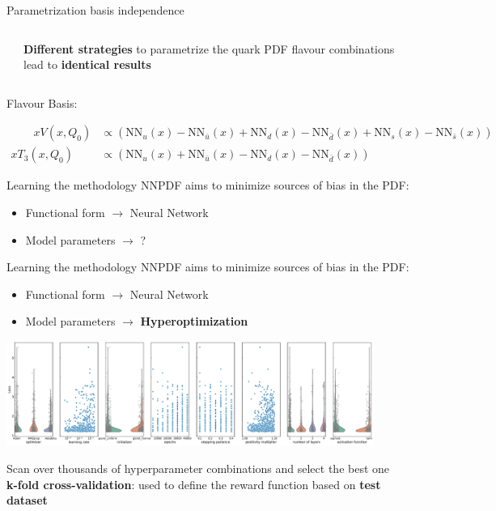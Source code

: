\documentclass[aspectratio=169,9pt]{beamer}
\begin{document}
\begin{frame}{Parametrization basis independence}
\begin{columns}
{		    }
            \begin{block}{}
                \textbf{Different strategies} to parametrize the quark PDF flavour combinations lead to \textbf{identical results}
            \end{block}
    \end{columns}
    \vspace*{-0.5em}
    Flavour Basis:
    {\footnotesize
    \begin{fleqn}
    \begin{align*}
        \qquad x V\left(x, Q_{0}\right) &\propto\left(\mathrm{NN}_{u}(x)-\mathrm{NN}_{\bar{u}}(x)+\mathrm{NN}_{d}(x)-\mathrm{NN}_{\bar{d}}(x)+\mathrm{NN}_{s}(x)-\mathrm{NN}_{\bar{s}}(x)\right) \\
        x T_{3}\left(x, Q_{0}\right) &\propto\left(\mathrm{NN}_{u}(x)+\mathrm{NN}_{\bar{u}}(x)-\mathrm{NN}_{d}(x)-\mathrm{NN}_{\bar{d}}(x)\right)
    \end{align*}
    \end{fleqn}
    }
\end{frame}



\begin{frame}[t]{Learning the methodology}
	NNPDF aims to minimize sources of bias in the PDF:
	\begin{itemize}
	    \item Functional form $\rightarrow$ Neural Network
	    \item Model parameters $\rightarrow$ ?
	\end{itemize}
\end{frame}


\begin{frame}[t]{Learning the methodology}
	NNPDF aims to minimize sources of bias in the PDF:
	\begin{itemize}
	    \item Functional form $\rightarrow$ Neural Network
	    \item Model parameters $\rightarrow$ \textbf{Hyperoptimization}
	\end{itemize}
	\begin{center}
	    \includegraphics[width=0.9\textwidth]{hyperopt_scan}
	\end{center}
    Scan over thousands of hyperparameter combinations and select the best one \\
    {\bf k-fold cross-validation}: used to define the reward function based on {\bf test dataset}
\end{frame}
\end{document}

